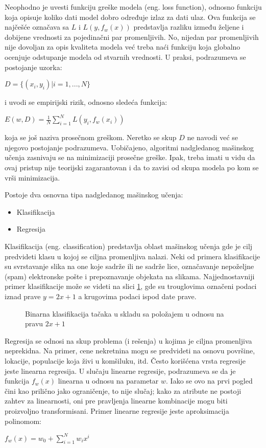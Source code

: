\par
Neophodno je uvesti funkciju greške modela (eng. loss function), odnosno funkciju koja opisuje koliko dati model dobro određuje izlaz za dati ulaz. Ova funkcija se najčešće označava sa $L$ i $L(y, f_w(x))$ predstavlja razliku između željene i dobijene vrednosti za pojedinačni par promenljivih. No, nijedan par promenljivih nije dovoljan za opis kvaliteta modela već treba naći funkciju koja globalno ocenjuje odstupanje modela od stvarnih vrednosti. U praksi, podrazumeva se postojanje uzorka:
\begin{center}
	$D=\{(x_i, y_i)|i=1,...,N\}$
\end{center}
i uvodi se empirijski rizik, odnosno sledeća funkcija:
\begin{center}
	$E(w, D) = \frac{1}{N}\sum_{i=1}^{N}L(y_i, f_w(x_i))$
\end{center}
koja se još naziva prosečnom greškom. Neretko se skup $D$ ne navodi već se njegovo postojanje podrazumeva. Uobičajeno, algoritmi nadgledanog mašinskog učenja zasnivaju se na minimizaciji prosečne greške. Ipak, treba imati u vidu da ovaj pristup nije teorijski zagarantovan i da to zavisi od skupa modela po kom se vrši minimizacija. \par

Postoje dva osnovna tipa nadgledanog mašinskog učenja:
\begin{itemize}
	\item Klasifikacija 
	\item Regresija
\end{itemize}

Klasifikacija (eng. classification) predstavlja oblast mašinskog učenja gde je cilj predvideti klasu u kojoj se ciljna promenljiva nalazi. Neki od primera klasifikacije su svrstavanje slika na one koje sadrže ili ne sadrže lice, označavanje nepoželjne (spam) elektronske pošte i prepoznavanje objekata na slikama. 
Najjednostavniji primer klasifikacije može se videti na slici \ref{fig:bin_klas}, gde su trouglovima označeni podaci iznad prave $y=2x+1$ a krugovima podaci ispod date prave.

\begin{figure}
	\centering
	\resizebox{.8\linewidth}{!}{}
	\caption{Binarna klasifikacija tačaka u skladu sa položajem u odnosu na pravu $2x+1$}
	\label{fig:bin_klas}
\end{figure}

\par
Regresija se odnosi na skup problema (i rešenja) u kojima je ciljna promenljiva neprekidna. Na primer, cene nekretnina mogu se predvideti na osnovu površine, lokacije, populacije koja živi u komšiluku, itd. Često korišćena vrsta regresije jeste linearna regresija. U slučaju linearne regresije, podrazumeva se da je funkcija $f_w(x)$ linearna u odnosu na parametar $w$. Iako se ovo na prvi pogled čini kao prilično jako ograničenje, to nije slučaj; kako za atribute ne postoji zahtev za linearnosti, oni pre pravljenja linearne kombinacije mogu biti proizvoljno transformisani. Primer linearne regresije jeste aproksimacija polinomom:
\begin{center}
	$f_w(x) = w_0 + \sum_{i=1}^{N}w_ix^i$
\end{center}

